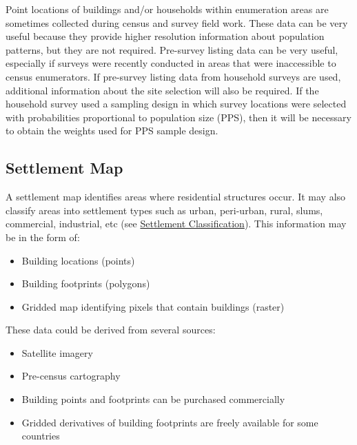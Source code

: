\documentclass[]{book}
\providecommand{\tightlist}{%
  \setlength{\itemsep}{0pt}\setlength{\parskip}{0pt}}
\begin{document}
Point locations of buildings and/or households within enumeration areas
are sometimes collected during census and survey field work. These data
can be very useful because they provide higher resolution information
about population patterns, but they are not required. Pre-survey listing
data can be very useful, especially if surveys were recently conducted
in areas that were inaccessible to census enumerators. If pre-survey
listing data from household surveys are used, additional information
about the site selection will also be required. If the household survey
used a sampling design in which survey locations were selected with
probabilities proportional to population size (PPS), then it will be
necessary to obtain the weights used for PPS sample design.

\subsection{Settlement Map}\label{settlement-map}

A settlement map identifies areas where residential structures occur. It
may also classify areas into settlement types such as urban, peri-urban,
rural, slums, commercial, industrial, etc (see
\protect\hyperlink{settlement-classification}{Settlement
Classification}). This information may be in the form of:

\begin{itemize}
\tightlist
\item
  Building locations (points)\\
\item
  Building footprints (polygons)\\
\item
  Gridded map identifying pixels that contain buildings (raster)
\end{itemize}

These data could be derived from several sources:

\begin{itemize}
\tightlist
\item
  Satellite imagery\\
\item
  Pre-census cartography\\
\item
  Building points and footprints can be purchased commercially
\item
  Gridded derivatives of building footprints are freely available for
  some countries \citep{dooley2020gridded}
\end{itemize}
\end{document}
